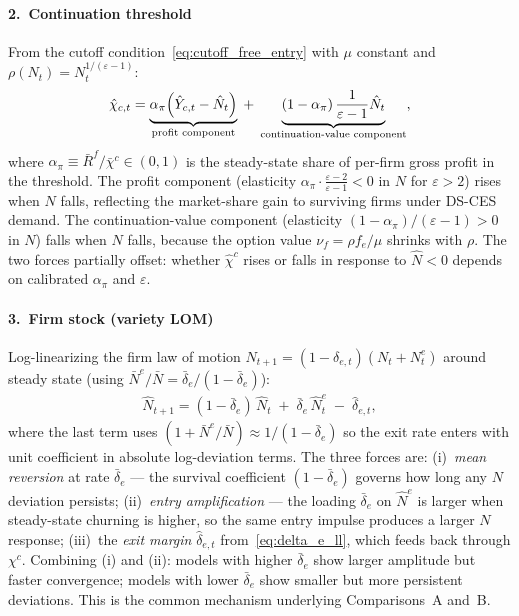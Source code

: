 \documentclass[authoryear, review, 12pt]{elsarticle}
\begin{document}
\paragraph{2.\ Continuation threshold}
From the cutoff condition~\eqref{eq:cutoff_free_entry} with $\mu$ constant
and $\rho(N_t) = N_t^{1/(\varepsilon-1)}$:
\begin{align}\label{eq:xc_ll}
    \hat\chi_{c,t}
    = \underbrace{\alpha_\pi\Bigl(\hat{Y}_{c,t} - \hat{N}_t\Bigr)}_{\text{profit component}}
    \;+\; \underbrace{(1-\alpha_\pi)\,\frac{1}{\varepsilon-1}\hat{N}_t}_{\text{continuation-value component}},
\end{align}
where $\alpha_\pi \equiv \bar{R}^f/\bar\chi^c \in(0,1)$ is the steady-state
share of per-firm gross profit in the threshold.  The profit component
(elasticity $\alpha_\pi\cdot\frac{\varepsilon-2}{\varepsilon-1} < 0$ in $N$
for $\varepsilon>2$) rises when $N$ falls, reflecting the market-share gain
to surviving firms under DS-CES demand.  The continuation-value component
(elasticity $(1-\alpha_\pi)/(\varepsilon-1) > 0$ in $N$) falls when $N$
falls, because the option value $\nu_f = \rho f_e/\mu$ shrinks with $\rho$.
The two forces partially offset: whether $\hat\chi^c$ rises or falls in
response to $\hat{N}<0$ depends on calibrated $\alpha_\pi$ and $\varepsilon$.

\paragraph{3.\ Firm stock (variety LOM)}
Log-linearizing the firm law of motion $N_{t+1}=(1-\delta_{e,t})(N_t+N_t^e)$
around steady state (using $\bar{N}^e/\bar{N}=\bar\delta_e/(1-\bar\delta_e)$):
\begin{align}\label{eq:N_lom_ll2}
    \hat{N}_{t+1}
    = (1-\bar\delta_e)\,\hat{N}_t
    \;+\; \bar\delta_e\,\hat{N}_t^e
    \;-\; \hat{\delta}_{e,t},
\end{align}
where the last term uses $(1+\bar{N}^e/\bar{N})\approx1/(1-\bar\delta_e)$ so
the exit rate enters with unit coefficient in absolute log-deviation terms.
The three forces are: (i)~\emph{mean reversion} at rate $\bar\delta_e$ — the
survival coefficient $(1-\bar\delta_e)$ governs how long any $N$ deviation
persists; (ii)~\emph{entry amplification} — the loading $\bar\delta_e$ on
$\hat{N}^e$ is larger when steady-state churning is higher, so the same
entry impulse produces a larger $N$ response; (iii)~the \emph{exit margin}
$\hat\delta_{e,t}$ from~\eqref{eq:delta_e_ll}, which feeds back through $\chi^c$.
Combining (i) and (ii): models with higher $\bar\delta_e$ show larger
amplitude but faster convergence; models with lower $\bar\delta_e$ show
smaller but more persistent deviations.  This is the common mechanism
underlying Comparisons~A and~B.
\end{document}
